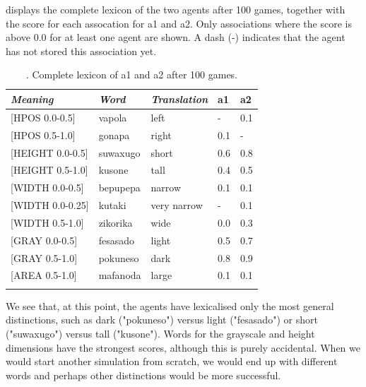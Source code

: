  displays the complete lexicon of the two agents after 100 games, 
together with the score for each assocation for 
{\bfshape  a1} and {\bfshape  a2}. Only associations where the 
score is above 0.0 for at least one agent are shown. 
A dash (-) indicates that the agent has not stored 
this association yet. 
\begin{table}
\begin{center}
\begin{tabular}{ l  l  l  l  l }
\lsptoprule
{\itshape Meaning}&{\itshape Word}&{\itshape Translation} & {\bfshape  a1}&{\bfshape  a2} \\ \midrule
{}[HPOS 0.0-0.5] & vapola&left&-&0.1\\ 
{}[HPOS 0.5-1.0]& gonapa&right &0.1&-\\ 
{}[HEIGHT 0.0-0.5]&suwaxugo&short &0.6&0.8\\ 
{}[HEIGHT 0.5-1.0]& kusone&tall &0.4&0.5\\ 
{}[WIDTH 0.0-0.5]&bepupepa&narrow &0.1&0.1\\ 
{}[WIDTH 0.0-0.25]&kutaki&very narrow &-&0.1\\ 
{}[WIDTH 0.5-1.0]& zikorika&wide &0.0&0.3\\ 
{}[GRAY 0.0-0.5]& fesasado&light &0.5&0.7\\ 
{}[GRAY 0.5-1.0]& pokuneso&dark &0.8&0.9\\ 
{}[AREA 0.5-1.0]& mafanoda&large &0.1&0.1\\ 
\lspbottomrule
\end{tabular}
\caption{\label{tab:lex100}. Complete lexicon of {\bfshape  a1} and {\bfshape  a2} after 100 games.}
\end{center}
\end{table}
We see that, at this point, the agents have lexicalised 
only the most general distinctions, such as dark ("pokuneso") 
versus light ("fesasado") or short ("suwaxugo") versus tall 
("kusone"). Words for the grayscale and height dimensions
have the strongest scores, although this is purely accidental. 
When we would start another simulation from scratch,
we would end up with different words and perhaps 
other distinctions would be more successful. 

